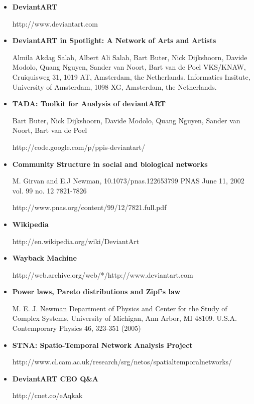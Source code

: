 \documentclass[12pt,a4paper]{report}
\begin{document}
\begin{itemize}

\item \textbf{DeviantART} 

http://www.deviantart.com 

\item \textbf{DeviantART in Spotlight: A Network of Arts and Artists }

Almila Akdag Salah, Albert Ali Salah, Bart Buter, Nick Dijkshoorn, Davide Modolo, Quang Nguyen, Sander van Noort, Bart van de Poel VKS/KNAW, Cruiquisweg 31, 1019 AT, Amsterdam, the Netherlands. Informatics Insitute, University of Amsterdam, 1098 XG, Amsterdam, the Netherlands.

\item \textbf{TADA: Toolkit for Analysis of deviantART}

Bart Buter, Nick Dijkshoorn, Davide Modolo, Quang Nguyen, Sander van Noort, Bart van de Poel 

http://code.google.com/p/ppis-deviantart/ 

\item \textbf{Community Structure in social and biological networks}

M. Girvan and E.J Newman, 10.1073/pnas.122653799 PNAS June 11, 2002 vol. 99 no. 12 7821-7826

http://www.pnas.org/content/99/12/7821.full.pdf

\item \textbf{Wikipedia} 

http://en.wikipedia.org/wiki/DeviantArt 

\item \textbf{Wayback Machine}

http://web.archive.org/web/*/http://www.deviantart.com 

\item \textbf{Power laws, Pareto distributions and Zipf's law}

M. E. J. Newman Department of Physics and Center for the Study of Complex Systems, University of Michigan, Ann Arbor, MI 48109. U.S.A.
Contemporary Physics 46, 323-351 (2005)

\item \textbf{STNA: Spatio-Temporal Network Analysis Project}

http://www.cl.cam.ac.uk/research/srg/netos/spatialtemporalnetworks/

\item \textbf{DeviantART CEO Q\&A}

http://cnet.co/eAqkak

\end{itemize}
\end{document}
